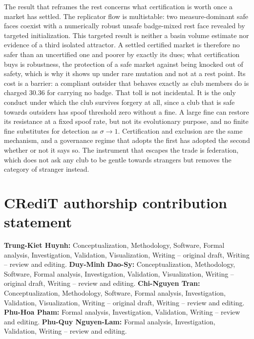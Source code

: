 \documentclass[preprint,12pt]{elsarticle}
\theoremstyle{plain}
\theoremstyle{definition}
\begin{document}
The result that reframes the rest concerns what certification is worth once a
market has settled. The replicator flow is multistable: two measure-dominant
safe faces coexist with a numerically robust unsafe badge-mixed rest face
revealed by targeted initialization. This targeted result is neither a basin
volume estimate nor evidence of a third isolated attractor. A
settled certified market is therefore no safer than an uncertified one and
poorer by exactly its dues; what certification buys is robustness, the
protection of a safe market against being knocked out of safety, which is why
it shows up under rare mutation and not at a rest point. Its cost is a
barrier: a compliant outsider that behaves exactly as club members do is
charged $30.36$ for carrying no badge. That toll is not incidental. It is the
only conduct under which the club survives forgery at all, since a club that
is safe towards outsiders has spoof threshold zero without a fine. A large
fine can restore its resistance at a fixed spoof rate, but not its evolutionary
purpose, and no finite fine substitutes for detection as $\sigma\to1$.
Certification and exclusion are the same mechanism, and a governance regime
that adopts the first has adopted the second whether or not it says so. The
instrument that escapes the trade is federation, which does not ask any club
to be gentle towards strangers but removes the category of stranger instead.


\section*{CRediT authorship contribution statement}

\textbf{Trung-Kiet Huynh:} Conceptualization, Methodology, Software, Formal
analysis, Investigation, Validation, Visualization, Writing -- original draft,
Writing -- review and editing.
\textbf{Duy-Minh Dao-Sy:} Conceptualization, Methodology, Software, Formal
analysis, Investigation, Validation, Visualization, Writing -- original draft,
Writing -- review and editing.
\textbf{Chi-Nguyen Tran:} Conceptualization, Methodology, Software, Formal
analysis, Investigation, Validation, Visualization, Writing -- original draft,
Writing -- review and editing.
\textbf{Phu-Hoa Pham:} Formal analysis, Investigation, Validation, Writing --
review and editing.
\textbf{Phu-Quy Nguyen-Lam:} Formal analysis, Investigation, Validation,
Writing -- review and editing.
\end{document}
